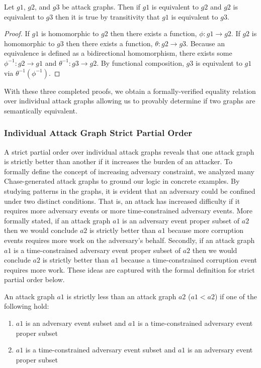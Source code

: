 \documentclass[runningheads]{llncs}
\theoremstyle{definition}
\newcommand{\squash}{\itemsep=0pt\parskip=0pt}
\begin{document}
\begin{theorem}
    Let $g1$, $g2$, and $g3$ be attack graphs. Then if $g1$ is equivalent to $g2$ and $g2$ is equivalent to $g3$ then it is true by transitivity that $g1$ is equivalent to $g3$.   
\end{theorem}
\begin{proof}
    If $g1$ is homomorphic to $g2$ then there exists a function, $\phi : g1 \to g2$. If $g2$ is homomorphic to $g3$ then there exists a function, $\theta : g2 \to g3$. Because an equivalence is defined as a bidirectional homomorphism, there exists some $\phi^{-1} : g2 \to g1$ and $\theta^{-1} : g3 \to g2$. By functional composition, $g3$ is equivalent to $g1$ via $\theta^{-1} (\phi^{-1}).$
\end{proof}

\noindent With these three completed proofs, we obtain a formally-verified equality relation over individual attack graphs allowing us to provably determine if two graphs are semantically equivalent.

\subsubsection*{Individual Attack Graph Strict Partial Order}

A strict partial order over individual attack graphs reveals that one attack graph is strictly better than another if it increases the burden of an attacker. To formally define the concept of increasing adversary constraint, we analyzed many Chase-generated attack graphs to ground our logic in concrete examples. By studying patterns in the graphs, it is evident that an adversary could be confined under two distinct conditions. That is, an attack has increased difficulty if it requires more adversary events or more time-constrained adversary events. More formally stated, if an attack graph $a1$ is an adversary event proper subset of $a2$ then we would conclude $a2$ is strictly better than $a1$ because more corruption events requires more work on the adversary's behalf. Secondly, if an attack graph $a1$ is a time-constrained adversary event proper subset of $a2$ then we would conclude $a2$ is strictly better than $a1$ because a time-constrained corruption event requires more work. These ideas are captured with the formal definition for strict partial order below.

\begin{definition}
    An attack graph $a1$ is strictly less than an attack graph $a2$ ($a1 < a2$) if one of the following hold: 
\begin{enumerate}
    \squash
    \item $a1$ is an adversary event subset and $a1$ is a time-constrained adversary event proper subset
    \item $a1$ is a time-constrained adversary event subset and $a1$ is an adversary event proper subset
\end{enumerate}
\end{definition}
\end{document}

